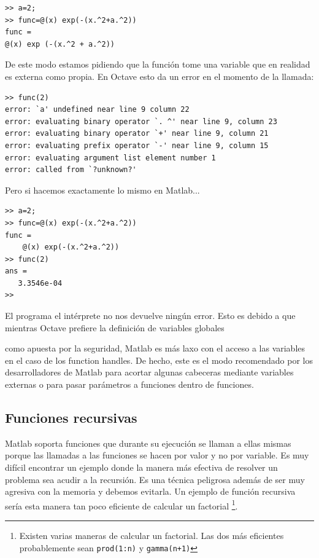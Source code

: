 \begin{lstlisting}
>> a=2;
>> func=@(x) exp(-(x.^2+a.^2)) 
func =
@(x) exp (-(x.^2 + a.^2))
\end{lstlisting}
De este modo estamos pidiendo que la función tome una variable que en
realidad es externa como propia. En Octave esto da un error en el
momento de la llamada:

\begin{lstlisting}
>> func(2)
error: `a' undefined near line 9 column 22
error: evaluating binary operator `. ^' near line 9, column 23
error: evaluating binary operator `+' near line 9, column 21
error: evaluating prefix operator `-' near line 9, column 15
error: evaluating argument list element number 1
error: called from `?unknown?'
\end{lstlisting}

Pero si hacemos exactamente lo mismo en Matlab...

\begin{lstlisting}
>> a=2;
>> func=@(x) exp(-(x.^2+a.^2))
func =
    @(x) exp(-(x.^2+a.^2))
>> func(2)
ans =
   3.3546e-04
>>
\end{lstlisting}
El programa el intérprete no nos devuelve ningún error. Esto es debido
a que mientras Octave prefiere la definición de variables globales

como apuesta por la seguridad, Matlab es más laxo con el acceso a las
variables en el caso de los function handles. De hecho, este es el
modo recomendado por los desarrolladores de Matlab para acortar
algunas cabeceras mediante variables externas o para pasar parámetros
a funciones dentro de funciones.


\subsection{Funciones recursivas}

Matlab soporta funciones que durante su ejecución se llaman a ellas
mismas porque las llamadas a las funciones se hacen por valor y no por
variable. Es muy difícil encontrar un ejemplo donde la manera más
efectiva de resolver un problema sea acudir a la recursión. Es una
técnica peligrosa además de ser muy agresiva con la memoria y debemos
evitarla. Un ejemplo de función recursiva sería esta manera tan poco
eficiente de calcular un factorial%
\footnote{Existen varias maneras de calcular un factorial. Las dos más
  eficientes probablemente sean \texttt{prod(1:n)} y
  \texttt{gamma(n+1)}%
}.

